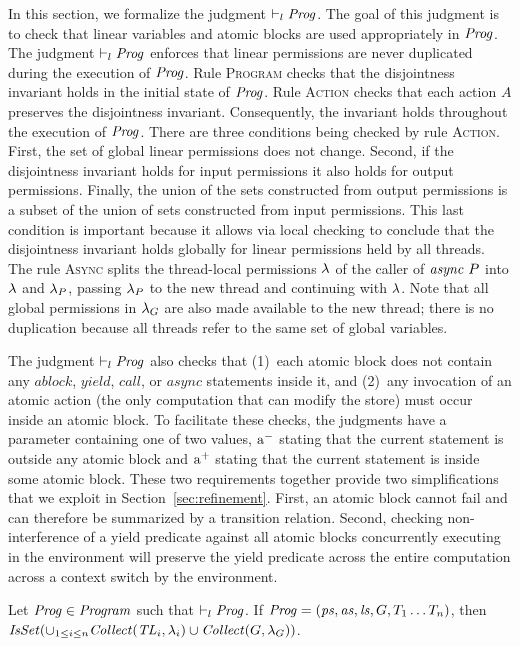 In this section, we formalize the judgment $\vdash_l \mathit{Prog}$.
The goal of this judgment is to check that
linear variables and atomic blocks are used appropriately in $\mathit{Prog}$.
The judgment $\vdash_l \mathit{Prog}$ enforces that linear permissions are never duplicated during the 
execution of $\mathit{Prog}$.
Rule \textsc{Program} checks that the disjointness invariant holds in the initial state of $\mathit{Prog}$.
Rule \textsc{Action} checks that each action $A$ preserves the disjointness invariant.
Consequently, the invariant holds throughout the execution of $\mathit{Prog}$.
There are three conditions being checked by rule \textsc{Action}.
First, the set of global linear permissions does not change.
Second, if the disjointness invariant holds for input permissions it also holds for output permissions.
Finally, the union of the sets constructed from output permissions is a subset of the union of sets
constructed from input permissions.  
This last condition is important because it allows via local checking to conclude that the disjointness invariant holds globally
for linear permissions held by all threads.
The rule \textsc{Async} splits the thread-local permissions $\lambda$ of the caller of $\mathit{async}\ P$ into $\lambda$ 
and $\lambda_P$, passing $\lambda_P$ to the new thread and continuing with $\lambda$.
Note that all global permissions in $\lambda_G$ are also made available to the new thread;
there is no duplication because all threads refer to the same set of global variables.

The judgment $\vdash_l \mathit{Prog}$ also checks that 
(1)~each atomic block does not contain any $\mathit{ablock}$, $\mathit{yield}$, $\mathit{call}$, or $\mathit{async}$ statements inside it, and
(2)~any invocation of an atomic action (the only computation that can modify the store) must occur inside an atomic block.
To facilitate these checks, the judgments have a parameter containing one of two values,
$\mathrm{a^-}$ stating that the current statement is outside any atomic block and
$\mathrm{a^+}$ stating that the current statement is inside some atomic block.
These two requirements together provide two simplifications that we exploit in Section~\ref{sec:refinement}.
First, an atomic block cannot fail and can therefore be summarized by a transition relation.
Second, checking non-interference of a yield predicate against all atomic blocks concurrently executing 
in the environment will preserve the yield predicate across the entire computation across a context switch by the environment.

\begin{lemma}
Let $\mathit{Prog} \in \mathit{Program}$ such that $\vdash_l \mathit{Prog}$.
If $\mathit{Prog} = (\mathit{ps}, \mathit{as}, \mathit{ls}, G, T_1 \ldots T_n)$, 
then $\mathit{IsSet}(\cup_{1 \le i \le n} \mathit{Collect}(\mathit{TL}_i, \lambda_i) \cup \mathit{Collect}(G, \lambda_G))$.
\end{lemma}

